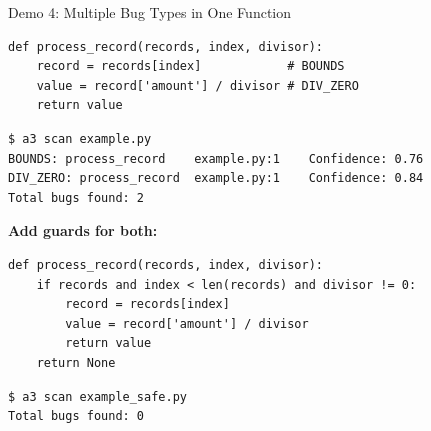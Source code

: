 \documentclass[aspectratio=169]{beamer}
\begin{document}
\begin{frame}[fragile]{Demo 4: Multiple Bug Types in One Function}

\begin{lstlisting}
def process_record(records, index, divisor):
    record = records[index]            # BOUNDS
    value = record['amount'] / divisor # DIV_ZERO
    return value
\end{lstlisting}

\begin{lstlisting}[style=bash]
$ a3 scan example.py
BOUNDS: process_record    example.py:1    Confidence: 0.76
DIV_ZERO: process_record  example.py:1    Confidence: 0.84
Total bugs found: 2
\end{lstlisting}

\vspace{0.3em}
\textbf{Add guards for both:}
\begin{lstlisting}
def process_record(records, index, divisor):
    if records and index < len(records) and divisor != 0:
        record = records[index]
        value = record['amount'] / divisor
        return value
    return None
\end{lstlisting}
\vspace{-0.3em}
\begin{lstlisting}[style=bash]
$ a3 scan example_safe.py
Total bugs found: 0
\end{lstlisting}

\end{frame}
\end{document}
